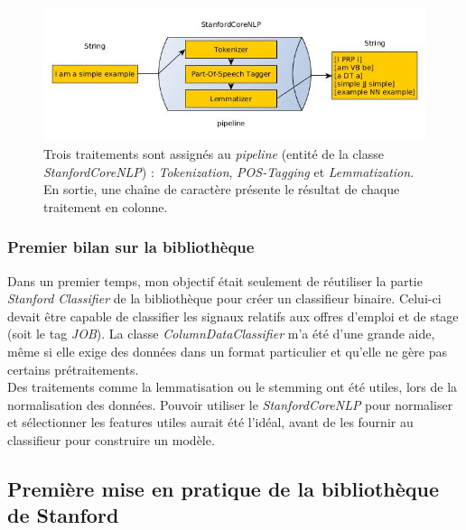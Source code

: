             \begin{figure}[h!]
                \centering
                \includegraphics[width=\textwidth]{images/coreNLP.jpg}
                \caption{Trois traitements sont assignés au \textit{pipeline} (entité de la classe \textit{StanfordCoreNLP}) : \textit{Tokenization}, \textit{POS-Tagging} et \textit{Lemmatization}. En sortie, une chaîne de caractère présente le résultat de chaque traitement en colonne.}
                \label{fig:coreNLP}
            \end{figure}

            \subsubsection{Premier bilan sur la bibliothèque}
                Dans un premier temps, mon objectif était seulement de réutiliser la partie \textit{Stanford Classifier} de la bibliothèque pour créer un classifieur binaire. Celui-ci devait être capable de classifier les signaux relatifs aux offres d'emploi et de stage (soit le tag \textit{JOB}). La classe \textit{ColumnDataClassifier} m'a été d'une grande aide, même si elle exige des données dans un format particulier et qu'elle ne gère pas certains prétraitements.\\

                Des traitements comme la lemmatisation ou le stemming ont été utiles, lors de la normalisation des données. Pouvoir utiliser le \textit{StanfordCoreNLP} pour normaliser et sélectionner les features utiles aurait été l'idéal, avant de les fournir au classifieur pour construire un modèle.

        \subsection{Première mise en pratique de la bibliothèque de Stanford}
        \label{ssec:premiere_mise_en_appli}
